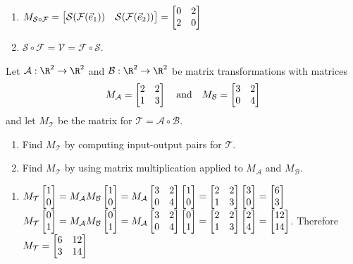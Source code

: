 \begin{exercises}
\begin{problist}
\begin{solution}
\begin{enumerate}
\begin{enumerate}
						\item $M_{\mathcal
							S
							\circ
							\mathcal
							F}=\mat{\mathcal
							S(
							\mathcal
							F(\xhat))&
							\mathcal
							S(\mathcal
							F(\yhat))}=\mat{0&2\\2&0}$

						\item $\mathcal
							S\circ
							\mathcal
							F=
							\mathcal
							V =
							\mathcal
							F
							\circ
							\mathcal
							S$.
					\end{enumerate}
			\end{enumerate}
		\end{solution}

		\prob Let $\mathcal A: \R^{2}\to \R^{2}$ and
		$\mathcal B: \R^{2}\to \R^{2}$ be matrix
		transformations with matrices
		\[
			M_{\mathcal A}= \mat{2&2\\1&3}\quad
			\text{and}\quad M_{\mathcal B}= \mat{3&2\\0&4}
		\]
		 and let $M_{\mathcal T}$ be the matrix for
		$\mathcal T=\mathcal A\circ\mathcal B$.
		\begin{enumerate}
			\item Find $M_{\mathcal T}$ by computing
				input-output pairs for $\mathcal
				T$.

			\item Find $M_{\mathcal T}$ by using
				matrix multiplication applied
				to $M_{\mathcal A}$ and $M_{\mathcal
				B}$.
		\end{enumerate}


		\begin{solution}

			\begin{enumerate}
				\item $M_{\mathcal T}\mat{1\\0}=
					M_{\mathcal A}M_{\mathcal
					B}\mat{1\\0}= M_{\mathcal
					A}\mat{3&2\\0&4}\mat{1\\0}=
					\mat{2&2\\1&3}\mat{3\\0}=
					\mat{6\\3}$ \\ $M_{\mathcal
					T}\mat{0\\1}= M_{\mathcal
					A}M_{\mathcal B}\mat{0\\1}=
					M_{\mathcal A}\mat{3&2\\0&4}\mat{0\\1}=
					\mat{2&2\\1&3}\mat{2\\4}=
					\mat{12\\14}$.
					Therefore
					$M_{\mathcal T}=
					\mat{6&12\\3&14}$


\end{enumerate}
\end{solution}
\end{problist}
\end{exercises}
